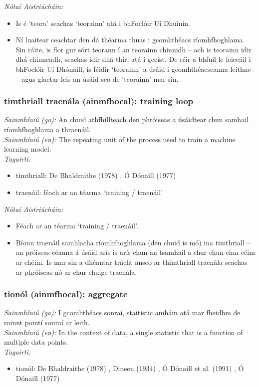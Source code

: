  \noindent \textit{Nótaí Aistriúcháin:}
\begin{itemize}
	\item Is é `teora' seachas `teorainn' atá i bhFoclóir Uí Dhuinín.
	\item Ní luaitear ceachtar den dá théarma thuas i gcomhthéacs ríomhfhoghlama. Sin ráite, is fíor gur sórt teorann í an teorainn chinnidh -- ach is teorainn idir dhá chinneadh, seachas idir dhá thír, atá i gceist. De réir a bhfuil le feiceáil i bhFoclóir Uí Dhónaill, is féidir `teorainn' a úsáid i gcomhthéacseanna leithne -- agus glactar leis an úsáid seo de `teorainn' mar sin.
\end{itemize}


\subsubsection*{timthriall traenála (ainmfhocal): training loop}
 \noindent \textit{Sainmhíniú (ga):} An chuid athfhillteach den phróiseas a úsáidtear chun samhail ríomhfhoghlama a thraenáil.
\\
 \noindent \textit{Sainmhíniú (en):} The repeating unit of the process used to train a machine learning model.
\\
 \noindent \textit{Tagairtí:}
\begin{itemize}
	\item timthriall: De Bhaldraithe (1978) \cite{de-bhaldraithe}, Ó Dónaill (1977) \cite{odonaill}
	\item traenáil: féach ar an téarma `training / traenáil'
\end{itemize}

 \noindent \textit{Nótaí Aistriúcháin:}
\begin{itemize}
	\item Féach ar an téarma `training / traenáil'.
	\item Bíonn traenáil samhlacha ríomhfhoghlama (den chuid is mó) ina timthriall -- an próiseas céanna á úsáid arís is arís chun an tsamhail a chur chun cinn céim ar chéim. Is mar sin a dhéantar trácht anseo ar thimthriall traenála seachas ar phróiseas nó ar chur chuige traenála.
\end{itemize}


\subsubsection*{tionól (ainmfhocal): aggregate}
 \noindent \textit{Sainmhíniú (ga):} I gcomhthéacs sonraí, staitistic amháin atá mar fheidhm de roinnt pointí sonraí ar leith.
\\
 \noindent \textit{Sainmhíniú (en):} In the context of data, a single statistic that is a function of multiple data points.
\\
 \noindent \textit{Tagairtí:}
\begin{itemize}
	\item tionól: De Bhaldraithe (1978) \cite{de-bhaldraithe}, Dineen (1934) \cite{dineen}, Ó Dónaill et al. (1991) \cite{focloir-beag}, Ó Dónaill (1977) \cite{odonaill}
\end{itemize}

